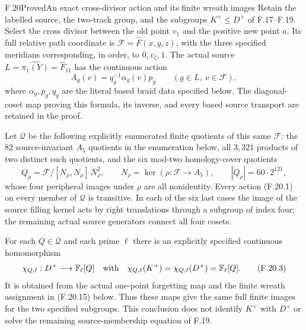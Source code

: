 \begin{claim}{F.20}{Proved}{An exact cross-divisor action and its finite wreath images}
Retain the labelled source, the two-track group, and the subgroups
$K^+\leq D^+$ of F.17--F.19. Select the cross divisor
between the old point $v_1$ and the positive new point $a$.
Its full relative path coordinate is
$\mathcal F=\widehat F(x,y,z)$, with the three specified
meridians corresponding, in order, to $0,v_\zeta,1$.
The actual source $L=\widehat{\pi_1(Y)}=\widehat F_{11}$
has the continuous action
\[
       A_g(v)=q_g^{-1}\alpha_g(v)p_g
                 \qquad(g\in L,\ v\in\mathcal F),
                                                               \tag{F.20.1}
\]
where $\alpha_g,p_g,q_g$ are the literal based braid data
specified below. The diagonal-coset map proving this
formula, its inverse, and every based source transport
are retained in the proof.

Let $\mathscr Q$ be the following explicitly enumerated
finite quotients of this same $\mathcal F$:
the $82$ source-invariant $A_5$ quotients in the enumeration
below, all $3,321$ products of two distinct such quotients,
and the six mod-two homology-cover quotients
\[
  Q_\rho=\mathcal F/
       \overline{[N_\rho,N_\rho]\,N_\rho^2},
       \qquad N_\rho=\ker(\rho:\mathcal F\to A_5),
       \qquad |Q_\rho|=60\cdot2^{121},
                                                               \tag{F.20.2}
\]
whose four peripheral images under $\rho$ are all nonidentity.
Every action (F.20.1) on every member of $\mathscr Q$ is
transitive. In each of the six last cases the image of the
source filling kernel acts by right translations through
a subgroup of index four; the remaining actual source
generators connect all four cosets.

For each $Q\in\mathscr Q$ and each prime $\ell$ there is
an explicitly specified continuous homomorphism
\[
 \chi_{Q,\ell}:D^+\longrightarrow\mathbb F_\ell[Q]
 \quad\hbox{with}\quad
 \chi_{Q,\ell}(K^+)=\chi_{Q,\ell}(D^+)=\mathbb F_\ell[Q].
                                                               \tag{F.20.3}
\]
It is obtained from the actual one-point forgetting map
and the finite wreath assignment in (F.20.15) below.
Thus these maps give the same full finite images for
the two specified subgroups. This conclusion does not
identify $K^+$ with $D^+$ or solve the remaining
source-membership equation of F.19.
\end{claim}


